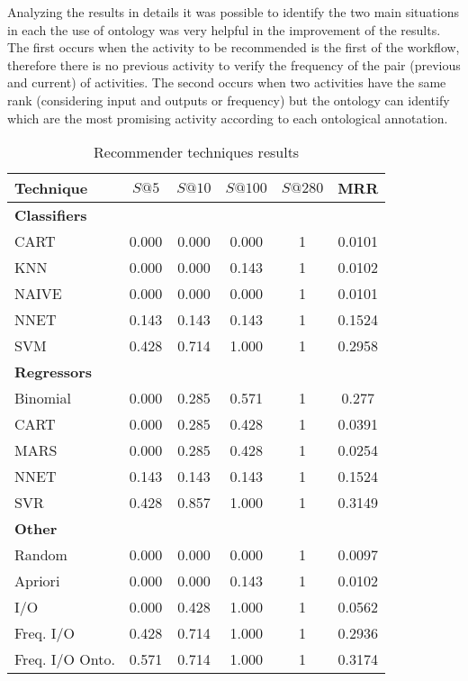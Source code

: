 \documentclass{sig-alternate-05-2015}
\begin{document}
Analyzing the results in details it was possible to identify the two main situations in each the use of ontology was very helpful in the improvement of the results. The first occurs when the activity to be recommended is the first of the workflow, therefore there is no previous activity to verify the frequency of the pair (previous and current) of activities. The second occurs when two activities have the same rank (considering input and outputs or frequency) but the ontology can identify which are the most promising activity according to each ontological annotation.

\begin{table}
\centering
\small
\caption{Recommender techniques results}
\label{TAB_RESULTADOS}

\begin{tabular}{|l|c|c|c|c|c|} \hline
\textbf{Technique} & \textbf{\(S@5\)} & \textbf{\(S@10\)} & \textbf{\(S@100\)} & \textbf{\(S@280\)} & \textbf{MRR} \\ \hline
\textbf{Classifiers} &&&&& \\ \hline
CART 								&	0.000	&	0.000	&	0.000	&	1	&	0.0101	\\ \hline
KNN 								&	0.000	&	0.000	&	0.143	&	1	&	0.0102	\\ \hline
NAIVE 								&	0.000	&	0.000	&	0.000	&	1	&	0.0101	\\ \hline
NNET 								&	0.143	&	0.143	&	0.143	&	1	&	0.1524	\\ \hline
SVM 								&	0.428	&	0.714	&	1.000	&	1	&	0.2958	\\ \hline
\textbf{Regressors} &&&&& \\ \hline
Binomial 							&	0.000	&	0.285	&	0.571	&	1	&	0.277	\\ \hline
CART 								&	0.000	&	0.285	&	0.428	&	1	&	0.0391	\\ \hline
MARS 								&	0.000	&	0.285	&	0.428	&	1	&	0.0254	\\ \hline
NNET 								&	0.143	&	0.143	&	0.143	&	1	&	0.1524	\\ \hline
SVR 								&	0.428	&	0.857	&	1.000	&	1	&	0.3149	\\ \hline
\textbf{Other} &&&&& \\ \hline
Random							&	0.000	&	0.000	&	0.000	&	1	&	0.0097	\\ \hline
Apriori								&	0.000	&	0.000	&	0.143	&	1	&	0.0102	\\ \hline
I/O									&	0.000	&	0.428	&	1.000	&	1	&	0.0562	\\ \hline
Freq. I/O							&	0.428	&	0.714	&	1.000	&	1	&	0.2936	\\ \hline
Freq. I/O Onto.						&	0.571	&	0.714	&	1.000	&	1	&	0.3174	\\ 
\hline\end{tabular}
\end{table}
\end{document}

